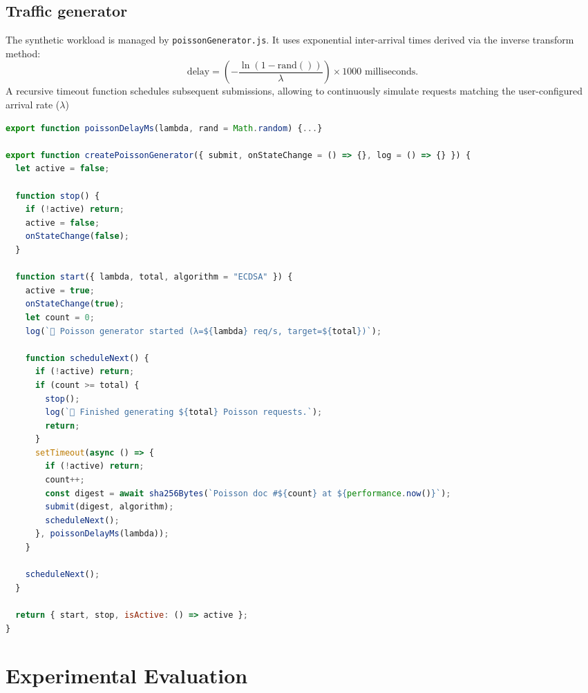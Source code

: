 \documentclass[11pt,a4paper]{article}
\begin{document}
\begin{spacing}{1.1}
\begin{lstlisting}[language=JavaScript, caption=ledger/auditLog.js]
\end{lstlisting}

\pagebreak
\subsection{Traffic generator}
The synthetic workload is managed by \texttt{poissonGenerator.js}. It uses exponential inter-arrival times derived via the inverse transform method:  $$\text{delay} = (-\frac{\ln(1-\text{rand}())} {\lambda}) \times 1000 \text{ milliseconds}.$$ A recursive timeout function schedules subsequent submissions, allowing to continuously simulate requests matching the user-configured arrival rate ($\lambda$)

\begin{lstlisting}[language=JavaScript, caption=sim/poissonGenerator.js]
export function poissonDelayMs(lambda, rand = Math.random) {...}

export function createPoissonGenerator({ submit, onStateChange = () => {}, log = () => {} }) {
  let active = false;

  function stop() {
    if (!active) return;
    active = false;
    onStateChange(false);
  }

  function start({ lambda, total, algorithm = "ECDSA" }) {
    active = true;
    onStateChange(true);
    let count = 0;
    log(`🚀 Poisson generator started (λ=${lambda} req/s, target=${total})`);

    function scheduleNext() {
      if (!active) return;
      if (count >= total) {
        stop();
        log(`🏁 Finished generating ${total} Poisson requests.`);
        return;
      }
      setTimeout(async () => {
        if (!active) return;
        count++;
        const digest = await sha256Bytes(`Poisson doc #${count} at ${performance.now()}`);
        submit(digest, algorithm);
        scheduleNext();
      }, poissonDelayMs(lambda));
    }

    scheduleNext();
  }

  return { start, stop, isActive: () => active };
}

\end{lstlisting}




\pagebreak


\section{Experimental Evaluation}


\end{spacing}
\end{document}
